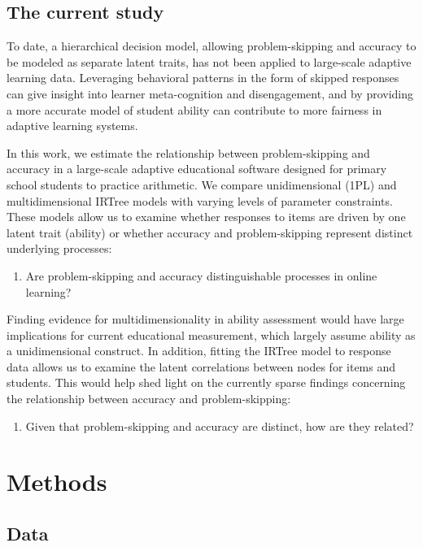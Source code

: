\documentclass[12pt]{article}
\begin{document}
\subsection{The current study}
To date, a hierarchical decision model, allowing problem-skipping and accuracy to be modeled as separate latent traits, has not been applied to large-scale adaptive learning data.
Leveraging behavioral patterns in the form of skipped responses can give insight into learner meta-cognition and disengagement, and by providing a more accurate model of student ability can contribute to more fairness in adaptive learning systems. 

In this work, we estimate the relationship between problem-skipping and accuracy in a large-scale adaptive educational software designed for primary school students to practice arithmetic. We compare unidimensional (1PL) and multidimensional IRTree models with varying levels of parameter constraints. These models allow us to examine whether responses to items are driven by one latent trait (ability) or whether accuracy and problem-skipping represent distinct underlying processes:

\begin{enumerate}
    \item[\textbf{RQ1:}] Are problem-skipping and accuracy distinguishable processes in online learning?  
\end{enumerate}

Finding evidence for multidimensionality in ability assessment would have large implications for current educational measurement, which largely assume ability as a unidimensional construct. In addition, fitting the IRTree model to response data allows us to examine the latent correlations between nodes for items and students. This would help shed light on the currently sparse findings concerning the relationship between accuracy and problem-skipping: 

\begin{enumerate}
    \item[\textbf{RQ2:}] Given that problem-skipping and accuracy are distinct, how are they related? 
\end{enumerate}

\section{Methods}
\subsection{Data}
\end{document}
